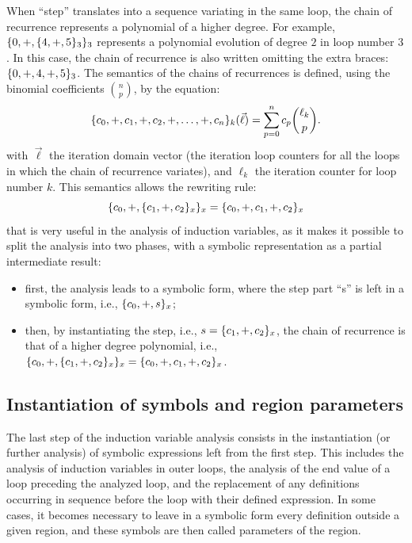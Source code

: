 When ``step'' translates into a sequence variating in the same loop,
the chain of recurrence represents a polynomial of a higher degree.
For example, $\{0, +, \{4, +, 5\}_3\}_3$ represents a
polynomial evolution of degree $2$ in loop number $3$.  In this case,
the chain of recurrence is also written omitting the extra braces:
$\{0, +, 4, +, 5\}_3$.  The semantics of the chains of recurrences
is defined, using the binomial coefficients $\binom{n}{p}$, by the
equation:
\begin{equation*}
  \{c_0,+,c_1,+,c_2,+,\ldots,+,c_n\}_k(\vec{\ell})=
  \sum_{p=0}^{n}c_{p}\binom{\ell_k}{p}.
\end{equation*}
with $\vec{\ell}$ the iteration domain vector (the iteration loop
counters for all the loops in which the chain of recurrence variates),
and $\ell_k$ the iteration counter for loop number $k$.  This
semantics allows the rewriting rule:
\begin{equation*}
  \{c_0, +, \{c_1, +, c_2\}_x\}_x = \{c_0, +, c_1, +, c_2\}_x
\end{equation*}
that is very useful in the analysis of induction variables, as it
makes it possible to split the analysis into two phases, with a
symbolic representation as a partial intermediate result:
\begin{itemize}
\item first, the analysis leads to a symbolic form, where the step
  part ``s'' is left in a symbolic form, i.e., $\{c_0, +, s\}_x$;
\item then, by instantiating the step, i.e., $s = \{c_1, +,
  c_2\}_x$, the chain of recurrence is that of a higher degree
  polynomial, i.e., $\{c_0, +, \{c_1, +, c_2\}_x\}_x =
  \{c_0, +, c_1, +, c_2\}_x$.
\end{itemize}

\subsection{Instantiation of symbols and region parameters}

The last step of the induction variable analysis consists in the
instantiation (or further analysis) of symbolic expressions left from
the first step.  This includes the analysis of induction variables in
outer loops, the analysis of the end value of a loop preceding the
analyzed loop, and the replacement of any definitions occurring in
sequence before the loop with their defined expression.  In some
cases, it becomes necessary to leave in a symbolic form every
definition outside a given region, and these symbols are then called
parameters of the region.

